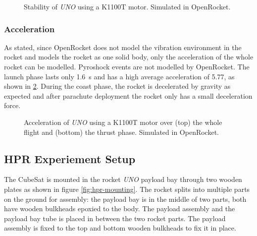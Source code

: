 \documentclass[]{report}
\begin{document}
\begin{figure}[H]
  
  \caption{Stability of \textit{UNO} using a K1100T motor. Simulated in OpenRocket.}
  \label{fig:openrocket-k-stability}
\end{figure}

\subsubsection{Acceleration}

As stated, since OpenRocket does not model the vibration environment in the rocket and models the rocket as one solid body, only the acceleration of the whole rocket can be modelled. Pyroshock events are not modelled by OpenRocket. The launch phase lasts only \SI{1.6}{\second} and has a high average acceleration of \SI{5.77}{\gacc}, as shown in \ref{fig:openrocket-k-acceleration}. During the coast phase, the rocket is decelerated by gravity as expected and after parachute deployment the rocket only has a small deceleration force.

\begin{figure}[H]
  
  
  \caption{Acceleration of \textit{UNO} using a K1100T motor over (top) the whole flight and (bottom) the thrust phase. Simulated in OpenRocket.}
  \label{fig:openrocket-k-acceleration}
\end{figure}


\subsection{HPR Experiement Setup}

The CubeSat is mounted in the rocket \textit{UNO} payload bay through two wooden plates as shown in figure \ref{fig:hpr-mounting}. The rocket splits into multiple parts on the ground for assembly: the payload bay is in the middle of two parts, both have wooden bulkheads epoxied to the body. The payload assembly and the payload bay tube is placed in between the two rocket parts. The payload assembly is fixed to the top and bottom wooden bulkheads to fix it in place.
\end{document}

